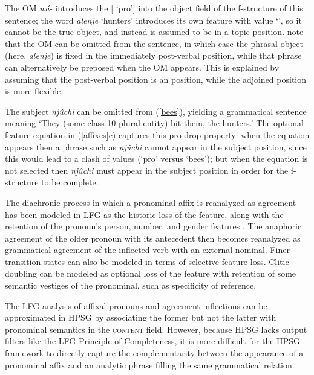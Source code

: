 The OM {\it w\'{a}-} introduces the [ `{pro}'] into the object field of the f-structure of this sentence; the word \textit{alenje} `hunters' introduces its own  feature with value `', so it cannot be the true object, and instead is assumed to be in a topic position.  \citet{bresnan+mchombo:1987} note that the OM can be omitted from the sentence, in which case the phrasal object (here, \textit{alenje}) is fixed in the immediately post-verbal position, while that phrase can alternatively be preposed when the OM appears.  This is explained by assuming that the post-verbal position is an  position, while the adjoined  position is more flexible.  

The subject \textit{nj\^{u}chi} can be omitted from (\ref{bees}), yielding a grammatical sentence meaning `They (some class 10 plural entity) bit them, the hunters.'  The optional  feature equation in (\ref{affixes}c) captures this pro-drop property: when the equation appears then a phrase such as \textit{nj\^{u}chi} cannot appear in the subject position, since this would lead to a clash of  values 
(`{pro}' versus `{bees}'); but when the equation is not selected then  \textit{nj\^{u}chi} must appear in the subject position in order for the f-structure to be complete.  

The diachronic process in which a pronominal affix is reanalyzed as agreement has been modeled in LFG as the historic loss of the  feature, along with the retention of the pronoun's person, number, and gender features \citep{coppock+wechsler:2010}.  The anaphoric agreement of the older pronoun with its antecedent then becomes reanalyzed as grammatical agreement of the inflected verb with an external nominal.  Finer transition states can also be modeled in terms of selective feature loss.  Clitic doubling can be modeled as optional loss of the  feature with retention of some semantic vestiges of the pronominal, such as specificity of reference.


The LFG analysis of  affixal pronouns and agreement inflections can be approximated in HPSG by associating the former but not the latter with pronominal semantics in the \textsc{content} field.  However, because HPSG lacks output filters like the LFG Principle of Completeness, it is more difficult for the HPSG framework to directly capture the complementarity between the appearance of a pronominal affix and an analytic phrase filling the same grammatical relation. 
                  
